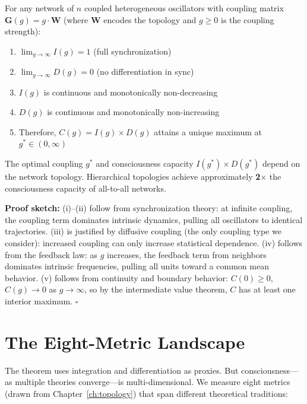 \begin{theorem}
\label{thm:id-tradeoff}
For any network of $n$ coupled heterogeneous oscillators with coupling matrix $\mathbf{G}(g) = g \cdot \mathbf{W}$ (where $\mathbf{W}$ encodes the topology and $g \geq 0$ is the coupling strength):

\begin{enumerate}
  \item[\textup{(i)}] $\lim_{g \to \infty} I(g) = 1$ (full synchronization)
  \item[\textup{(ii)}] $\lim_{g \to \infty} D(g) = 0$ (no differentiation in sync)
  \item[\textup{(iii)}] $I(g)$ is continuous and monotonically non-decreasing
  \item[\textup{(iv)}] $D(g)$ is continuous and monotonically non-increasing
  \item[\textup{(v)}] Therefore, $C(g) = I(g) \times D(g)$ attains a unique maximum at $g^* \in (0, \infty)$
\end{enumerate}

The optimal coupling $g^*$ and consciousness capacity $I(g^*) \times D(g^*)$ depend on the network topology. Hierarchical topologies achieve approximately \textbf{2$\times$} the consciousness capacity of all-to-all networks.
\end{theorem}

\textbf{Proof sketch:} (i)--(ii) follow from synchronization theory: at infinite coupling, the coupling term dominates intrinsic dynamics, pulling all oscillators to identical trajectories. (iii) is justified by diffusive coupling (the only coupling type we consider): increased coupling can only increase statistical dependence. (iv) follows from the feedback law: as $g$ increases, the feedback term from neighbors dominates intrinsic frequencies, pulling all units toward a common mean behavior. (v) follows from continuity and boundary behavior: $C(0) \geq 0$, $C(g) \to 0$ as $g \to \infty$, so by the intermediate value theorem, $C$ has at least one interior maximum. \hfill $\square$

\section{The Eight-Metric Landscape}

The theorem uses integration and differentiation as proxies. But consciousness---as multiple theories converge---is multi-dimensional. We measure eight metrics (drawn from Chapter~\ref{ch:topology}) that span different theoretical traditions:

